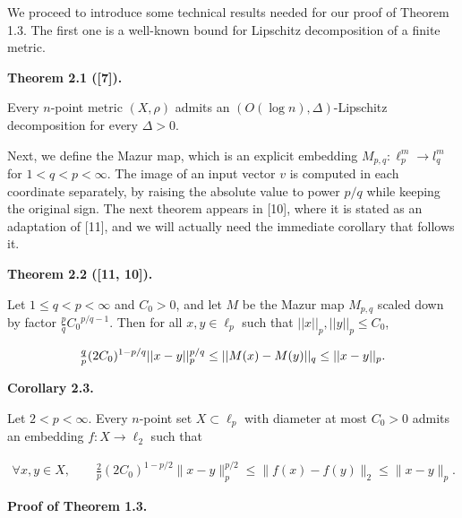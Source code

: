 \par
\par
We proceed to introduce some technical results needed for our proof of Theorem 1.3. The first one is a well-known bound for Lipschitz decomposition of a finite metric.
\par
\par
\par\medskip\noindent\textbf{Theorem 2.1 ([7]).}\par
Every $n$-point metric $(X,\rho)$ admits an $\left(O\left(\log n\right),\Delta\right)$-Lipschitz decomposition for every $\Delta>0$.
\par
\par
\par
Next, we define the Mazur map, which is an explicit embedding $M_{p,q}:\ell_{p}^{m}\to l_{q}^{m}$ for $1<q<p<\infty$. The image of an input vector $v$ is computed in each coordinate separately, by raising the absolute value to power $p/q$ while keeping the original sign. The next theorem appears in [10], where it is stated as an adaptation of [11], and we will actually need the immediate corollary that follows it.
\par
\par
\par\medskip\noindent\textbf{Theorem 2.2 ([11, 10]).}\par
Let $1\leq{q}<p<\infty$ and $C_{0}>0$, and let $M$ be the Mazur map $M_{p,q}$ scaled down by factor $\frac{p}{q}{C_{0}}^{p/q-1}$. Then for all $x,y\in\ell_{p}$ such that $||x||_{p},||y||_{p}\leq C_{0}$,
\par
\[\begin{aligned}
\tfrac{q}{p}(2C_{0})^{1-p/q}||x-y||_{p}^{p/q}\leq||M(x)-M(y)||_{q}\leq||x-y||_%
{p}.
\end{aligned}\]
\par
\par
\par\medskip\noindent\textbf{Corollary 2.3.}\par
Let $2<p<\infty$. Every $n$-point set $X\subset\ell_{p}$ with diameter at most $C_{0}>0$ admits an embedding $f:X\to\ell_{2}$ such that
\par
\[\begin{aligned}
\forall x,y\in X,\qquad\tfrac{2}{p}(2C_{0})^{1-p/2}\|x-y\|_{p}^{p/2}\leq\|f(x)%
-f(y)\|_{2}\leq\|x-y\|_{p}.
\end{aligned}\]
\par
\par
\par\medskip\noindent\textbf{Proof of Theorem 1.3.}\par
